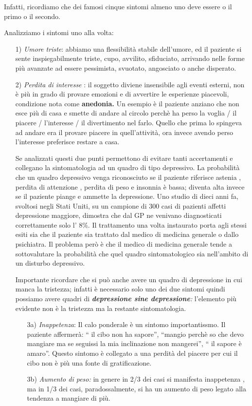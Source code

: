 Infatti, ricordiamo che dei famosi cinque sintomi almeno uno deve essere
o il primo o il secondo.

Analizziamo i sintomi uno alla volta:
\begin{itemize}
\item[1)]
\emph{Umore triste}: abbiamo una flessibilità stabile dell'umore, ed
il paziente si sente inspiegabilmente triste, cupo, avvilito,
sfiduciato, arrivando nelle forme più avanzate ad essere pessimista,
svuotato, angosciato o anche disperato.
\item[2)]
\emph{Perdita di interesse} : il soggetto diviene insensibile agli
eventi esterni, non è più in grado di provare emozioni e di avvertire le
esperienze piacevoli, condizione nota come \textbf{anedonia.} Un esempio
è il paziente anziano che non esce più di casa e smette di andare al
circolo perchè ha perso la voglia / il piacere / l'interesse / il
divertimento nel farlo. Quello che prima lo spingeva ad andare era il
provare piacere in quell'attività, ora invece avendo perso l'interesse
preferisce restare a casa.

Se analizzati questi due punti permettono di evitare tanti accertamenti
e collegano la sintomatologia ad un quadro di tipo depressivo. La
probabilità che un quadro depressivo venga riconosciuto se il paziente
riferisce astenia , perdita di attenzione , perdita di peso e insonnia è
bassa; diventa alta invece se il paziente piange e ammette la
depressione. Uno studio di dieci anni fa, svoltosi negli Stati Uniti, su
un campione di 300 casi di pazienti affetti depressione maggiore,
dimostra che dal GP ne venivano diagnosticati correttamente solo l' 8\%.
Il trattamento una volta instaurato porta agli stessi esiti sia che il
paziente sia trattato dal medico di medicina generale o dallo
psichiatra. Il problema però è che il medico di medicina generale tende
a sottovalutare la probabilità che quel quadro sintomatologico sia
nell'ambito di un disturbo depressivo.

Importante ricordare che si può anche avere un quadro di depressione in
cui manca la tristezza; infatti è necessario solo uno dei due sintomi
quindi possiamo avere quadri di \emph{\textbf{depressione sine
depressione}:} l'elemento più evidente non è la tristezza ma la restante
sintomatologia.
\begin{itemize}
\item[3a)]
\emph{Inappetenza}: Il calo ponderale è un sintomo importantissmo. Il
paziente affermerà: `` il cibo non ha sapore'', ``mangio perchè so che
devo mangiare ma se seguissi la mia inclinazione non mangerei'', `` il
sapore è amaro''. Questo sintomo è collegato a una perdità del piacere
per cui il cibo non è più una fonte di gratificazione.
\item[3b)]
\emph{Aumento di peso:} in genere in 2/3 dei casi si manifesta
inappetenza , ma in 1/3 dei casi, paradossalmente, si ha un aumento di
peso legato alla tendenza a mangiare di più.
\end{itemize}


\end{itemize}
